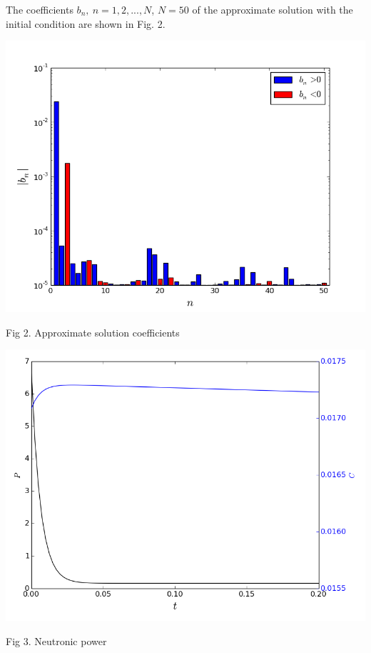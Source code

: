 \documentclass[landscape,a1paper,fontscale=0.5]{poster}
\begin{document}
\begin{poster}
{\vspace{0.5em}
The coefficients $b_n, \ n = 1,2, ..., N$, $N=50$ of the approximate solution with the initial condition are shown in Fig. 2.

\begin{minipage}{0.5\textwidth}
\includegraphics[width=1\linewidth]{12.png}  
\begin{center}
\vspace{-1em}
Fig 2. Approximate solution coefficients
\end{center}
\end{minipage}
\begin{minipage}{0.5\textwidth}
\includegraphics[width=1\linewidth] {14.png}
\begin{center}
\vspace{-1em}
Fig 3. Neutronic power
\end{center}
\end{minipage}

}
\end{poster}
\end{document}
